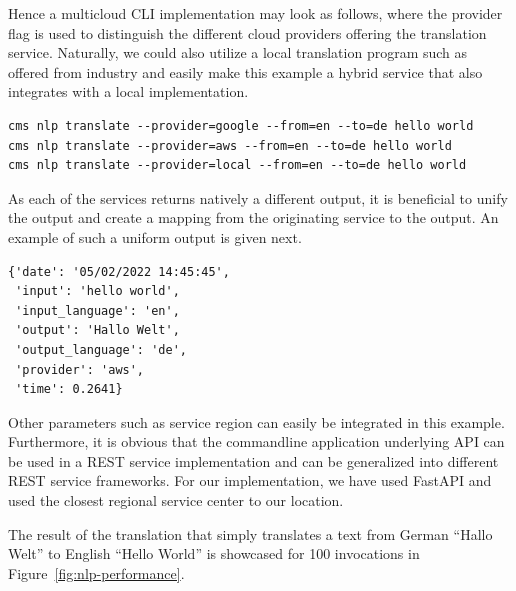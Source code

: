 Hence a multicloud CLI implementation may look as follows, where the
provider flag is used to distinguish the different cloud providers
offering the translation service. Naturally, we could also utilize a
local translation program such as offered from industry and easily make
this example a hybrid service that also integrates with a local
implementation.

\begin{Verbatim}[fontsize=\small]
cms nlp translate --provider=google --from=en --to=de hello world
cms nlp translate --provider=aws --from=en --to=de hello world
cms nlp translate --provider=local --from=en --to=de hello world
\end{Verbatim}


As each of the services returns natively a different output, it is
beneficial to unify the output and create a mapping from the
originating service to the output. An example of such a uniform output is given next.


\begin{Verbatim}[fontsize=\small]
{'date': '05/02/2022 14:45:45',
 'input': 'hello world',
 'input_language': 'en',
 'output': 'Hallo Welt',
 'output_language': 'de',
 'provider': 'aws',
 'time': 0.2641}
\end{Verbatim}


Other parameters such as service region can easily be integrated in
this example. Furthermore, it is obvious that the commandline
application underlying API can be used in a REST service
implementation and can be generalized into different REST service
frameworks. For our implementation, we have used FastAPI and used the
closest regional service center to our location.

The result of the translation that simply translates a text from
German ``Hallo Welt'' to English ``Hello World'' is showcased for 100
invocations in Figure~\ref{fig:nlp-performance}. 


